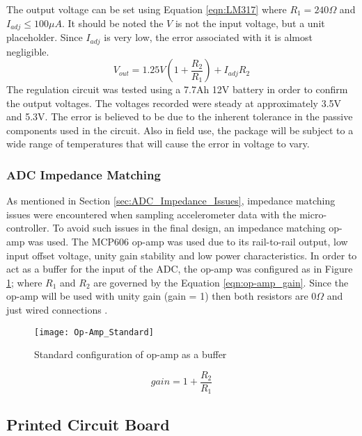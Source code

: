 The output voltage can be set using Equation \ref{eqn:LM317} where $R_1= 240\Omega$ and $I_{adj}\le 100\mu A$.
It should be noted the $V$ is not the input voltage, but a unit placeholder.
Since $I_{adj}$ is very low, the error associated with it is almost negligible. 
\begin{equation}
V_{out} = 1.25V(1+\frac{R_2}{R_1}) + I_{adj}R_2
\label{eqn:LM317}
\end{equation}
The regulation circuit was tested using a 7.7Ah 12V battery in order to confirm the output voltages. %
The voltages recorded were steady at approximately 3.5V and 5.3V.
The error is believed to be due to the inherent tolerance in the passive components used in the circuit.
Also in field use, the package will be subject to a wide range of temperatures that will cause the error in voltage to vary.

\subsubsection{ADC Impedance Matching}
\label{sec:ADC_Impedance_Matching}
As mentioned in Section \ref{sec:ADC_Impedance_Issues}, impedance matching issues were encountered when sampling accelerometer data with the micro-controller.
To avoid such issues in the final design, an impedance matching op-amp was used.
The MCP606 op-amp was used due to its rail-to-rail output, low input offset voltage, unity gain stability and low power characteristics. 
In order to act as a buffer for the input of the ADC, the op-amp was configured as in Figure \ref{fig:op-amp_standard}; where $R_1$ and $R_2$ are governed by the Equation \ref{eqn:op-amp_gain}. 
Since the op-amp will be used with unity gain (gain = 1) then both resistors are $0\Omega$ and just wired connections \cite{ArtofElectronics}.

\begin{figure}
\centering
\texttt{[image: Op-Amp\_Standard]}
\caption{Standard configuration of op-amp as a buffer}
\label{fig:op-amp_standard}
\end{figure}

\begin{equation}
gain = 1 + \frac{R_{2}}{R_{1}}
\label{eqn:op-amp_gain}
\end{equation}

\subsection{Printed Circuit Board}
\label{sec:PCB}